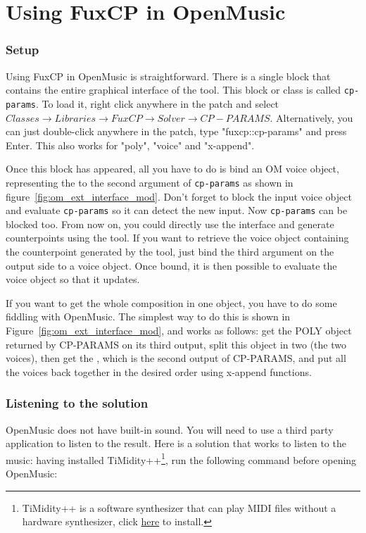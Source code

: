\section{Using FuxCP in OpenMusic}
\subsubsection*{Setup}
Using FuxCP in OpenMusic is straightforward. There is a single block that contains the entire graphical interface of the tool. This block or class is called \texttt{cp-params}. To load it, right click anywhere in the patch and select $ \mathit{Classes}\to  \mathit{Libraries}\to  \mathit{FuxCP}\to  \mathit{Solver}\to  \mathit{CP-PARAMS}$. Alternatively, you can just double-click anywhere in the patch, type "fuxcp::cp-params" and press Enter. This also works for "poly", "voice" and "x-append".

Once this block has appeared, all you have to do is bind an OM voice object, representing the \cfcomma to the second argument of \texttt{cp-params} as shown in figure~\ref{fig:om_ext_interface_mod}. Don't forget to block the input voice object and evaluate \texttt{cp-params} so it can detect the new input. Now \texttt{cp-params} can be blocked too. From now on, you could directly use the interface and generate counterpoints using the tool. If you want to retrieve the voice object containing the counterpoint generated by the tool, just bind the third argument on the output side to a voice object. Once bound, it is then possible to evaluate the voice object so that it updates.

If you want to get the whole composition in one object, you have to do some fiddling with OpenMusic. The simplest way to do this is shown in Figure~\ref{fig:om_ext_interface_mod}, and works as follows: get the POLY object returned by CP-PARAMS on its third output, split this object in two (the two voices), then get the \cfs, which is the second output of CP-PARAMS, and put all the voices back together in the desired order using x-append functions. 

\subsubsection*{Listening to the solution}
OpenMusic does not have built-in sound. You will need to use a third party application to listen to the result. Here is a solution that works to listen to the music: having installed TiMidity++\footnote{TiMidity++ is a software synthesizer that can play MIDI files without a hardware synthesizer, click \href{https://timidity.sourceforge.net/}{here} to install.}, run the following command before opening OpenMusic:


